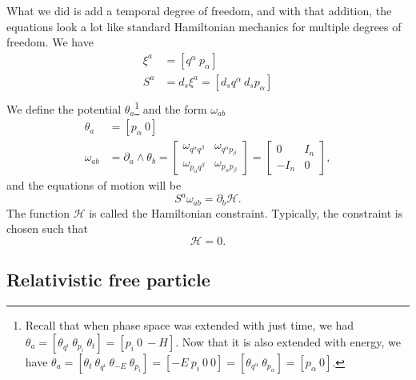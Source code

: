 What we did is add a temporal degree of freedom, and with that addition, the equations look a lot like standard Hamiltonian mechanics for multiple degrees of freedom. We have
\begin{equation}
	\begin{aligned}
		\xi^a &= [q^\alpha \ p_\alpha ] \\
		S^a &= d_s \xi^a = [d_s q^\alpha \ d_s p_\alpha] \\
	\end{aligned}
\end{equation}
We define the potential $\theta_a$\footnote{Recall that when phase space was extended with just time, we had $\theta_a = [\theta_{q^i} \ \theta_{p_i} \ \theta_t] = [p_i \ 0 \ -H]$. Now that it is also extended with energy, we have $\theta_a = [\theta_t \ \theta_{q^i} \ \theta_{-E} \ \theta_{p_i} ] = [-E \ p_i \ 0 \ 0] = [\theta_{q^\alpha} \ \theta_{p_\alpha} ] = [p_\alpha \ 0]$. } and the form $\omega_{ab}$
\begin{equation}\label{rp-cm-rel-symplecticForm}
	\tag{SF-FE}
	\begin{aligned}
		\theta_a &= [p_\alpha \ 0] \\
	\omega_{ab} &= \partial_a \wedge \theta_b = \left[\begin{array}{cc}
		\omega_{q^\alpha q^\beta} & \omega_{q^\alpha p_\beta} \\
		\omega_{p_\alpha q^\beta} & \omega_{p_\alpha p_\beta} 
	\end{array} \right]= \left[\begin{array}{cc}
		0 & I_n \\
		- I_n & 0 
	\end{array} \right],
	\end{aligned}
\end{equation}
and the equations of motion will be
\begin{equation}
	S^a \omega_{ab} = \partial_b \mathcal{H}.
\end{equation}
The function $\mathcal{H}$ is called the Hamiltonian constraint. Typically, the constraint is chosen such that
\begin{equation}
	\mathcal{H}=0.
\end{equation}

\subsection{Relativistic free particle}

